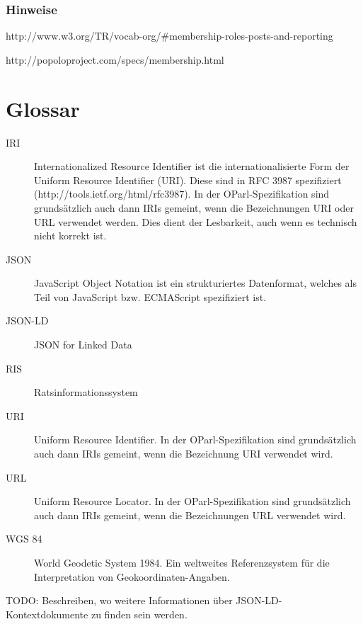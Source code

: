 \documentclass[,a4paper]{article}
\begin{document}
\subsubsection{Hinweise}\label{hinweise}

http://www.w3.org/TR/vocab-org/\#membership-roles-posts-and-reporting

http://popoloproject.com/specs/membership.html

\section{Glossar}\label{glossar}

\begin{description}
\item[IRI]
Internationalized Resource Identifier ist die internationalisierte Form
der Uniform Resource Identifier (URI). Diese sind in RFC 3987
spezifiziert (http://tools.ietf.org/html/rfc3987). In der
OParl-Spezifikation sind grundsätzlich auch dann IRIs gemeint, wenn die
Bezeichnungen URI oder URL verwendet werden. Dies dient der Lesbarkeit,
auch wenn es technisch nicht korrekt ist.
\item[JSON]
JavaScript Object Notation ist ein strukturiertes Datenformat, welches
als Teil von JavaScript bzw. ECMAScript spezifiziert ist.
\item[JSON-LD]
JSON for Linked Data
\item[RIS]
Ratsinformationssystem
\item[URI]
Uniform Resource Identifier. In der OParl-Spezifikation sind
grundsätzlich auch dann IRIs gemeint, wenn die Bezeichnung URI verwendet
wird.
\item[URL]
Uniform Resource Locator. In der OParl-Spezifikation sind grundsätzlich
auch dann IRIs gemeint, wenn die Bezeichnungen URL verwendet wird.
\item[WGS 84]
World Geodetic System 1984. Ein weltweites Referenzsystem für die
Interpretation von Geokoordinaten-Angaben.
\end{description}


TODO: Beschreiben, wo weitere Informationen über
JSON-LD-Kontextdokumente zu finden sein werden.
\end{document}

